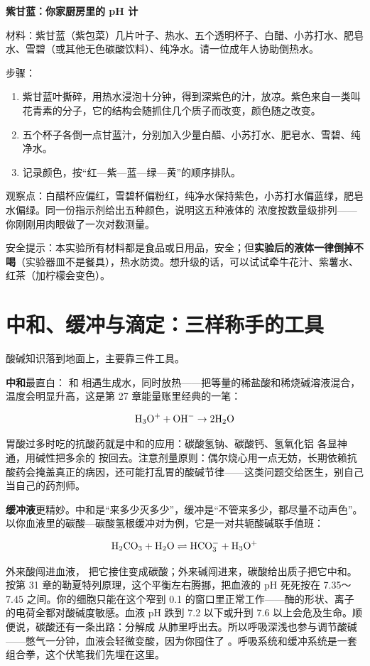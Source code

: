 \begin{shiyan}
\textbf{紫甘蓝：你家厨房里的 pH 计}

材料：紫甘蓝（紫包菜）几片叶子、热水、五个透明杯子、白醋、小苏打水、肥皂水、雪碧（或其他无色碳酸饮料）、纯净水。请一位成年人协助倒热水。

步骤：
\begin{enumerate}[itemsep=1pt]
\item 紫甘蓝叶撕碎，用热水浸泡十分钟，得到深紫色的汁，放凉。紫色来自一类叫花青素的分子，它的结构会随抓住几个质子而改变，颜色随之改变。
\item 五个杯子各倒一点甘蓝汁，分别加入少量白醋、小苏打水、肥皂水、雪碧、纯净水。
\item 记录颜色，按“红—紫—蓝—绿—黄”的顺序排队。
\end{enumerate}

观察点：白醋杯应偏红，雪碧杯偏粉红，纯净水保持紫色，小苏打水偏蓝绿，肥皂水偏绿。同一份指示剂给出五种颜色，说明这五种液体的  浓度按数量级排列——你刚刚用肉眼做了一次对数测量。

安全提示：本实验所有材料都是食品或日用品，安全；但\textbf{实验后的液体一律倒掉不喝}（实验器皿不是餐具），热水防烫。想升级的话，可以试试牵牛花汁、紫薯水、红茶（加柠檬会变色）。
\end{shiyan}

\section{中和、缓冲与滴定：三样称手的工具}

酸碱知识落到地面上，主要靠三件工具。

\textbf{中和}最直白： 和  相遇生成水，同时放热——把等量的稀盐酸和稀烧碱溶液混合，温度会明显升高，这是第 27 章能量账里经典的一笔：

\[\mathrm{H_3O^+} + \mathrm{OH^-} \rightarrow \mathrm{2H_2O}\]

胃酸过多时吃的抗酸药就是中和的应用：碳酸氢钠、碳酸钙、氢氧化铝  各显神通，用碱性把多余的  按回去。注意剂量原则：偶尔烧心用一点无妨，长期依赖抗酸药会掩盖真正的病因，还可能打乱胃的酸碱节律——这类问题交给医生，别自己当自己的药剂师。

\textbf{缓冲液}更精妙。中和是“来多少灭多少”，缓冲是“不管来多少，都尽量不动声色”。以你血液里的碳酸—碳酸氢根缓冲对为例，它是一对共轭酸碱联手值班：

\[\mathrm{H_2CO_3} + \mathrm{H_2O} \rightleftharpoons \mathrm{HCO_3^-} + \mathrm{H_3O^+}\]

外来酸闯进血液， 把它接住变成碳酸；外来碱闯进来，碳酸给出质子把它中和。按第 31 章的勒夏特列原理，这个平衡左右腾挪，把血液的 pH 死死按在 7.35～7.45 之间。你的细胞只能在这个窄到 0.1 的窗口里正常工作——酶的形状、离子的电荷全都对酸碱度敏感。血液 pH 跌到 7.2 以下或升到 7.6 以上会危及生命。顺便说，碳酸还有一条出路：分解成  从肺里呼出去。所以呼吸深浅也参与调节酸碱——憋气一分钟，血液会轻微变酸，因为你囤住了 。呼吸系统和缓冲系统是一套组合拳，这个伏笔我们先埋在这里。

